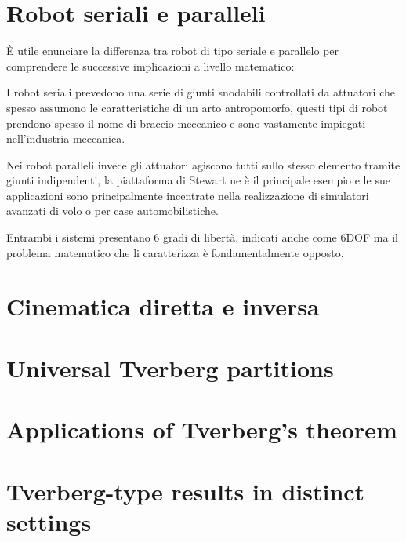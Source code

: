 \documentclass[11pt]{article}
\begin{document}
\section{Robot seriali e paralleli}\label{robotserialiparalleli}
È utile enunciare la differenza tra robot di tipo seriale e parallelo per comprendere le successive implicazioni a livello matematico:

I robot seriali prevedono una serie di giunti snodabili controllati da attuatori che spesso assumono le caratteristiche di un arto antropomorfo, questi tipi di robot prendono spesso il nome di braccio meccanico e sono vastamente impiegati nell'industria meccanica.

Nei robot paralleli invece gli attuatori agiscono tutti sullo stesso elemento tramite giunti indipendenti, la piattaforma di Stewart ne è il principale esempio e le sue applicazioni sono principalmente incentrate nella realizzazione di simulatori avanzati di volo o per case automobilistiche.

Entrambi i sistemi presentano 6 gradi di libertà, indicati anche come 6DOF ma il problema matematico che li caratterizza è fondamentalmente opposto.


\section{Cinematica diretta e inversa}\label{cinematicadirettainversa}

\section{Universal Tverberg partitions}\label{section-universal}

\section{Applications of Tverberg's theorem}\label{section-applications}

\section{Tverberg-type results in distinct settings}\label{section-spaces}


\end{document}

